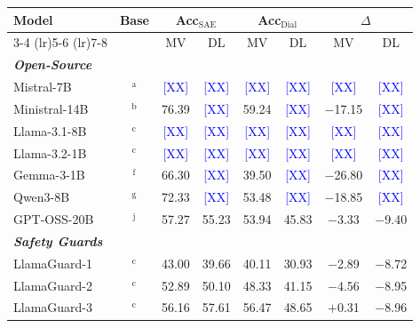 
\begin{table}[t]
\centering
\scriptsize
\begin{tabular}{lccccccc}
\toprule
\textbf{Model} & \textbf{Base} & \multicolumn{2}{c}{\textbf{Acc$_{\text{SAE}}$}} & \multicolumn{2}{c}{\textbf{Acc$_{\text{Dial}}$}} & \multicolumn{2}{c}{\textbf{$\Delta$}} \\
\cmidrule(lr){3-4} \cmidrule(lr){5-6} \cmidrule(lr){7-8}
 &  & \textsc{MV} & \textsc{DL} & \textsc{MV} & \textsc{DL} & \textsc{MV} & \textsc{DL} \\
\midrule
\multicolumn{8}{l}{\textbf{\textit{Open-Source}}} \\
Mistral-7B & $^\text{a}$ & \textcolor{blue}{[XX]} & \textcolor{blue}{[XX]} & \textcolor{blue}{[XX]} & \textcolor{blue}{[XX]} & \textcolor{blue}{[XX]} & \textcolor{blue}{[XX]} \\
Ministral-14B & $^\text{b}$ & 76.39 & \textcolor{blue}{[XX]} & 59.24 & \textcolor{blue}{[XX]} & $-$17.15 & \textcolor{blue}{[XX]} \\
Llama-3.1-8B & $^\text{c}$ & \textcolor{blue}{[XX]} & \textcolor{blue}{[XX]} & \textcolor{blue}{[XX]} & \textcolor{blue}{[XX]} & \textcolor{blue}{[XX]} & \textcolor{blue}{[XX]} \\
Llama-3.2-1B & $^\text{c}$ & \textcolor{blue}{[XX]} & \textcolor{blue}{[XX]} & \textcolor{blue}{[XX]} & \textcolor{blue}{[XX]} & \textcolor{blue}{[XX]} & \textcolor{blue}{[XX]} \\
Gemma-3-1B & $^\text{f}$ & 66.30 & \textcolor{blue}{[XX]} & 39.50 & \textcolor{blue}{[XX]} & $-$26.80 & \textcolor{blue}{[XX]} \\
Qwen3-8B & $^\text{g}$ & 72.33 & \textcolor{blue}{[XX]} & 53.48 & \textcolor{blue}{[XX]} & $-$18.85 & \textcolor{blue}{[XX]} \\
GPT-OSS-20B & $^\text{j}$ & 57.27 & 55.23 & 53.94 & 45.83 & $-$3.33 & $-$9.40 \\
\midrule
\multicolumn{8}{l}{\textbf{\textit{Safety Guards}}} \\
LlamaGuard-1 & $^\text{c}$ & 43.00 & 39.66 & 40.11 & 30.93 & $-$2.89 & $-$8.72 \\
LlamaGuard-2 & $^\text{c}$ & 52.89 & 50.10 & 48.33 & 41.15 & $-$4.56 & $-$8.95 \\
LlamaGuard-3 & $^\text{c}$ & 56.16 & 57.61 & 56.47 & 48.65 & $+$0.31 & $-$8.96 \\

\end{tabular}
\end{table}
